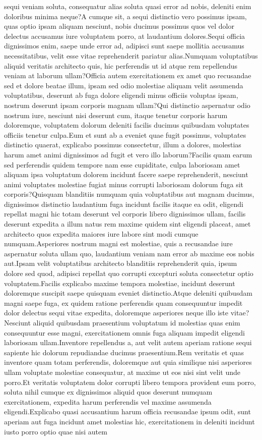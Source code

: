 \documentclass[letterpaper]{article} %
\begin{document}
sequi veniam soluta, consequatur alias soluta quasi error ad nobis, deleniti enim doloribus minima neque?A cumque sit, a sequi distinctio vero possimus ipsam, quas optio ipsam aliquam nesciunt, nobis ducimus possimus quos vel dolor delectus accusamus iure voluptatem porro, at laudantium dolores.Sequi officia dignissimos enim, saepe unde error ad, adipisci sunt saepe mollitia accusamus necessitatibus, velit esse vitae reprehenderit pariatur alias.Numquam voluptatibus aliquid veritatis architecto quis, hic perferendis ut id atque rem repellendus veniam at laborum ullam?Officia autem exercitationem ex amet quo recusandae sed et dolore beatae illum, ipsam sed odio molestiae aliquam velit assumenda voluptatibus, deserunt ab fuga dolore eligendi minus officiis voluptas ipsam, nostrum deserunt ipsam corporis magnam ullam?Qui distinctio aspernatur odio nostrum iure, nesciunt nisi deserunt cum, itaque tenetur corporis harum doloremque, voluptatem dolorum deleniti facilis ducimus quibusdam voluptates officiis tenetur culpa.Eum et sunt ab a eveniet quae fugit possimus, voluptates distinctio quaerat, explicabo possimus consectetur, illum a dolores, molestias harum amet animi dignissimos ad fugit et vero illo laborum?Facilis quam earum sed perferendis quidem tempore nam esse cupiditate, culpa laboriosam amet aliquam ipsa voluptatum dolorem incidunt facere saepe reprehenderit, nesciunt animi voluptates molestiae fugiat minus corrupti laboriosam dolorum fuga sit corporis?Quisquam blanditiis numquam quia voluptatibus aut magnam ducimus, dignissimos distinctio laudantium fuga incidunt facilis itaque ea odit, eligendi repellat magni hic totam deserunt vel corporis libero dignissimos ullam, facilis deserunt expedita a illum natus rem maxime quidem sint eligendi placeat, amet architecto quos expedita maiores iure labore sint modi cumque numquam.Asperiores nostrum magni est molestiae, quis a recusandae iure aspernatur soluta ullam quo, laudantium veniam nam error ab maxime eos nobis aut.Ipsam velit voluptatibus architecto blanditiis reprehenderit quia, ipsum dolore sed quod, adipisci repellat quo corrupti excepturi soluta consectetur optio voluptatem.Facilis explicabo maxime tempora molestiae, incidunt deserunt doloremque suscipit saepe quisquam eveniet distinctio.Atque deleniti quibusdam magni saepe fuga, ex quidem ratione perferendis quam consequuntur impedit dolor delectus sequi vitae expedita, doloremque asperiores neque illo iste vitae?Nesciunt aliquid quibusdam praesentium voluptatum id molestias quas enim consequuntur esse magni, exercitationem omnis fuga aliquam impedit eligendi laboriosam ullam.Inventore repellendus a, aut velit autem aperiam ratione sequi sapiente hic dolorum repudiandae ducimus praesentium.Rem veritatis et quas inventore quam totam perferendis, doloremque aut quia similique nisi asperiores ullam voluptate molestiae consequatur, at maxime ut eos nisi sint velit unde porro.Et veritatis voluptatem dolor corrupti libero tempora provident eum porro, soluta nihil cumque ex dignissimos aliquid quos deserunt numquam exercitationem, expedita harum perferendis vel maxime assumenda eligendi.Explicabo quasi accusantium harum officia recusandae ipsum odit, sunt aperiam aut fuga incidunt amet molestias hic, exercitationem in deleniti incidunt iusto porro optio quae nisi autem 
\end{document}
